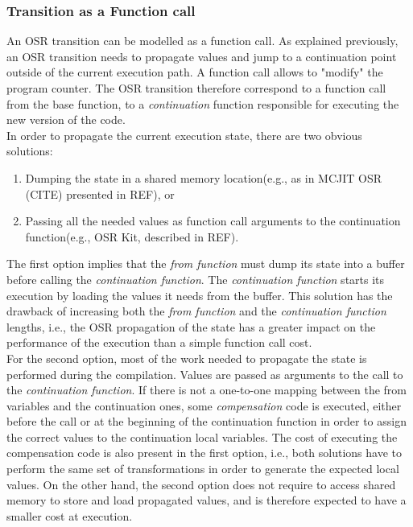 \subsubsection{Transition as a Function call}
An OSR transition can be modelled as a function call.
As explained previously, an OSR transition needs to propagate values and jump to a continuation point outside of the current execution path.
A function call allows to "modify" the program counter.
The OSR transition therefore correspond to a function call from the base function, to a \textit{continuation} function responsible for executing the new version of the code.\\

In order to propagate the current execution state, there are two obvious solutions: 
\begin{enumerate}
    \item Dumping the state in a shared memory location(e.g., as in MCJIT OSR (CITE) presented in REF), or
    \item Passing all the needed values as function call arguments to the continuation function(e.g., OSR Kit, described in REF).
\end{enumerate}

The first option implies that the \textit{from function} must dump its state into a buffer before calling the \textit{continuation function}.
The \textit{continuation function} starts its execution by loading the values it needs from the buffer.
This solution has the drawback of increasing both the \textit{from function} and the \textit{continuation function} lengths, i.e., the OSR propagation of the state has a greater impact on the performance of the execution than a simple function call cost.\\

For the second option, most of the work needed to propagate the state is performed during the compilation.
Values are passed as arguments to the call to the \textit{continuation function}.
If there is not a one-to-one mapping between the from variables and the continuation ones, some \textit{compensation} code is executed, either before the call or at the beginning of the continuation function in order to assign the correct values to the continuation local variables.
The cost of executing the compensation code is also present in the first option, i.e., both solutions have to perform the same set of transformations in order to generate the expected local values.
On the other hand, the second option does not require to access shared memory to store and load propagated values, and is therefore expected to have a smaller cost at execution.\\

